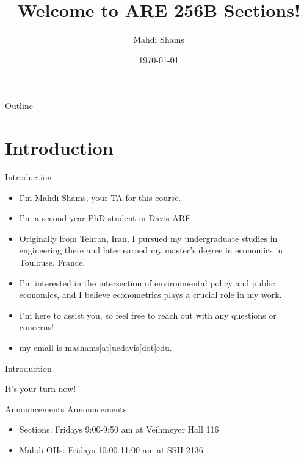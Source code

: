 \documentclass{beamer}
\title{Welcome to ARE 256B Sections!}
\author{Mahdi Shams}
\date{\today}
\begin{document}
\begin{frame}
    \titlepage 
\end{frame}


\begin{frame}{Outline}
    \tableofcontents
\end{frame}

\section{Introduction}

\begin{frame}{Introduction}
\begin{itemize}
    \item I'm \href{https://www.youtube.com/watch?v=J9wRl5TVFvc}{Mahdi} Shams,
     your TA for this course. 
    \item I'm a second-year PhD student in Davis ARE. 
    \item Originally from Tehran, Iran, I pursued my undergraduate studies in 
    engineering there and later earned my master's degree in economics in 
    Toulouse, France.
    \item I'm interested in the intersection of environmental policy and public 
    economics, and I believe econometrics plays a crucial role in my work. 
  
  
  \item I'm here to assist you, so feel free to reach out with any questions or 
    concerns!
 \item my email is mashams[at]ucdavis[dot]edu.
  
\end{itemize}
\end{frame}

\begin{frame}{Introduction}
\begin{center}
    \Huge It's your turn now!
    \end{center}
\end{frame} 

\begin{frame}{Announcements}
Announcements:
\begin{itemize}
    \item Sections: Fridays 9:00-9:50 am at Veihmeyer Hall 116
    \item Mahdi OHs: Fridays 10:00-11:00 am at SSH 2136  
\end{itemize}
\end{frame}
\end{document}
